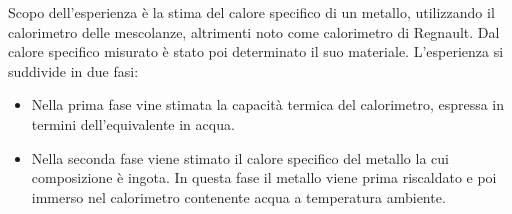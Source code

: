 Scopo dell'esperienza è la stima del calore specifico di un metallo, utilizzando il calorimetro delle mescolanze, altrimenti noto come calorimetro di Regnault. Dal calore specifico misurato è stato poi determinato il suo materiale. L'esperienza si suddivide in due fasi:
\begin{itemize}
    \item Nella prima fase vine stimata la capacità termica del calorimetro, espressa in termini dell'equivalente in acqua. 
    \item Nella seconda fase viene stimato il calore specifico del metallo la cui composizione è ingota. In questa fase il metallo viene prima riscaldato e poi immerso nel calorimetro contenente acqua a temperatura ambiente.
\end{itemize}